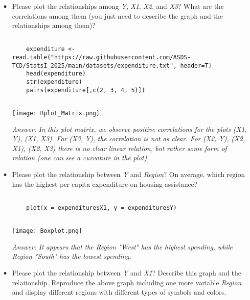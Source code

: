 \documentclass[12pt,letterpaper]{article}
\begin{document}
\begin{itemize}

\item
Please plot the relationships among \emph{Y}, \emph{X1}, \emph{X2}, and \emph{X3}? What are the correlations among them (you just need to describe the graph and the relationships among them)?

\begin{verbatim}
	
	expenditure <- read.table("https://raw.githubusercontent.com/ASDS-TCD/StatsI_2025/main/datasets/expenditure.txt", header=T)
	head(expenditure)
	str(expenditure)
	pairs(expenditure[,c(2, 3, 4, 5)])
	
\end{verbatim}

\begin{center}
	\texttt{[image: Rplot\_Matrix.png]}
\end{center}


\textit{Answer: In this plot matrix, we observe positive correlations for the plots (X1, Y), (X1, X3). For (X3, Y), the correlation is not as clear. For (X2, Y), (X2, X1), (X2, X3) there is no clear linear relation, but rather some form of relation (one can see a curvature in the plot). 
}

\vspace{.5cm}
\item
Please plot the relationship between \emph{Y} and \emph{Region}? On average, which region has the highest per capita expenditure on housing assistance?

\begin{verbatim}
	
	plot(x = expenditure$X1, y = expenditure$Y) 
	
\end{verbatim}

\begin{center}
	\texttt{[image: Boxplot.png]}
\end{center}

\textit{ Answer: It appears that the Region "West" has the highest spending, while Region  "South" has the lowest spending. 
}
\vspace{.5cm}
\item
Please plot the relationship between \emph{Y} and \emph{X1}? Describe this graph and the relationship. Reproduce the above graph including one more variable \emph{Region} and display different regions with different types of symbols and colors.


\end{itemize}
\end{document}

